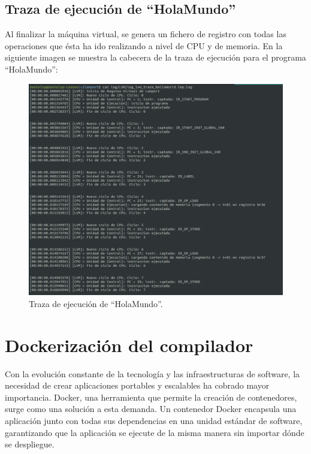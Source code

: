 \subsection{Traza de ejecución de ``HolaMundo''}
Al finalizar la máquina virtual, se genera un fichero de registro con todas las operaciones que ésta ha ido realizando a nivel de CPU y de memoria. En la siguiente imagen se muestra la cabecera de la traza de ejecución para el programa ``HolaMundo'':
\begin{figure}[h]
  \begin{minipage}{\linewidth}
    \centering
    \includegraphics[width=\linewidth]{images/implementacion/ejecucion/resumed_traza.png}
    \caption{Traza de ejecución de ``HolaMundo''.}
    \label{fig:trazaHolaMundo}
  \end{minipage}
\end{figure}

\newpage
\section{Dockerización del compilador}
Con la evolución constante de la tecnología y las infraestructuras de software, la necesidad de crear aplicaciones portables y escalables ha cobrado mayor importancia. Docker, una herramienta que permite la creación de contenedores, surge como una solución a esta demanda. Un contenedor Docker encapsula una aplicación junto con todas sus dependencias en una unidad estándar de software, garantizando que la aplicación se ejecute de la misma manera sin importar dónde se despliegue. 




